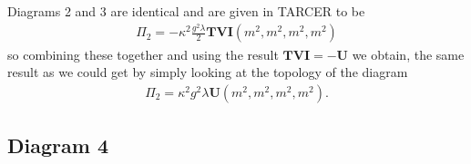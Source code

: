\documentclass[11pt]{article}
\newcommand{\tarcer}{\textsf{TARCER} }
\begin{document}
\noindent\begin{minipage}{0.7\textwidth}
Diagrams 2 and 3 are identical and are given in \tarcer to be
\begin{align}
\Pi_2 = -\kappa^2 \frac{g^2\lambda}{2} \mathbf{TVI}(m^2,m^2,m^2,m^2)
\end{align}
so combining these together and using the result $ \mathbf{TVI}=-\mathbf{U}$ we obtain, the same result as we could get by simply looking at the topology of the diagram
\begin{align}
\Pi_2 =  \kappa^2 g^2\lambda \mathbf{U}(m^2,m^2,m^2,m^2).
\end{align}
\end{minipage}




\subsection*{Diagram 4}
\end{document}

